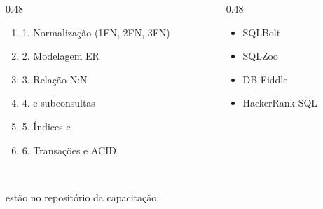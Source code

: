 \begin{frame}{}
  \vspace{0.8em}
  \begin{columns}[T]
    \begin{column}{0.48\textwidth}
      \begin{enumerate}
        \item[] {\small 1. Normalização (1FN, 2FN, 3FN)}
        \item[] {\small 2. Modelagem ER}
        \item[] {\small 3. Relação N:N}
        \item[] {\small 4.  e subconsultas}
        \item[] {\small 5. Índices e }
        \item[] {\small 6. Transações e ACID}
      \end{enumerate}
    \end{column}
    \begin{column}{0.48\textwidth}
      \begin{itemize}
        \item[] {\small SQLBolt}
        \item[] {\small SQLZoo}
        \item[] {\small DB Fiddle}
        \item[] {\small HackerRank SQL}
      \end{itemize}
    \end{column}
  \end{columns}

  \vspace{1.2em}
  \begin{center}
    \\
    {\small estão no repositório da capacitação.}
  \end{center}

\end{frame}

